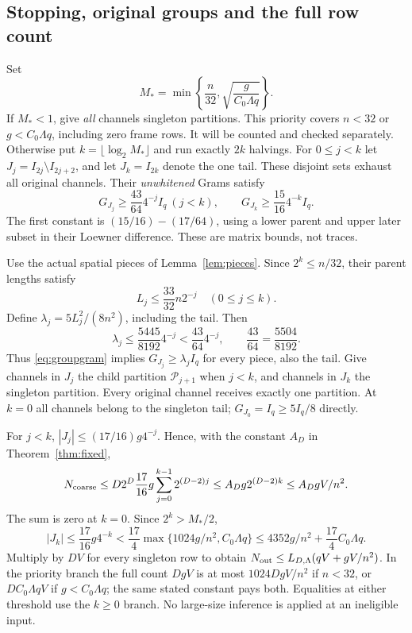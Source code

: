 \subsection{Stopping, original groups and the full row count}
Set
\begin{equation}\label{eq:stop}
 M_* =\min\left\{\frac n{32},\sqrt{\frac g{C_0\Lambda q}}\right\}.
\end{equation}
If $M_*<1$, give \emph{all} channels singleton partitions. This priority
covers $n<32$ or $g<C_0\Lambda q$, including zero frame rows. It will be
counted and checked separately. Otherwise put $k=\lfloor\log_2M_*\rfloor$
and run exactly $2k$ halvings. For $0\leq j<k$ let
$J_j=I_{2j}\setminus I_{2j+2}$, and let $J_k=I_{2k}$ denote the one tail.
These disjoint sets exhaust all original channels. Their \emph{unwhitened}
Grams satisfy
\begin{equation}\label{eq:groupgram}
 G_{J_j}\geq\frac{43}{64}4^{-j}I_q\ (j<k),\qquad
 G_{J_k}\geq\frac{15}{16}4^{-k}I_q.
\end{equation}
The first constant is $(15/16)-(17/64)$, using a lower parent and upper
later subset in their Loewner difference. These are matrix bounds, not traces.

Use the actual spatial pieces of Lemma~\ref{lem:pieces}. Since
$2^k\leq n/32$, their parent lengths satisfy
\[
 L_j\leq\frac{33}{32}n2^{-j}\quad(0\leq j\leq k).
\]
Define $\lambda_j=5L_j^2/(8n^2)$, including the tail. Then
\begin{equation}\label{eq:lambda}
 \lambda_j\leq\frac{5445}{8192}4^{-j}
       <\frac{43}{64}4^{-j},
 \qquad \frac{43}{64}=\frac{5504}{8192}.
\end{equation}
Thus \eqref{eq:groupgram} implies $G_{J_j}\geq\lambda_jI_q$ for every
piece, also the tail. Give channels in $J_j$ the child partition
$\mathcal P_{j+1}$ when $j<k$, and channels in $J_k$ the singleton partition.
Every original channel receives exactly one partition. At $k=0$ all channels
belong to the singleton tail; $G_{J_0}=I_q\geq5I_q/8$ directly.

For $j<k$, $|J_j|\leq(17/16)g4^{-j}$. Hence, with the constant $A_D$ in
Theorem~\ref{thm:fixed},
\[
 N_{\rm coarse}\leq D2^D\frac{17}{16}g
              \sum_{j=0}^{k-1}2^{(D-2)j}
 \leq A_Dg2^{(D-2)k}\leq A_DgV/n^2.
\]
The sum is zero at $k=0$. Since $2^k>M_*/2$,
\[
 |J_k|\leq\frac{17}{16}g4^{-k}
 <\frac{17}{4}\max\{1024g/n^2,C_0\Lambda q\}
 \leq4352g/n^2+\frac{17}{4}C_0\Lambda q.
\]
Multiply by $DV$ for every singleton row to obtain
$N_{\rm out}\leq L_{D,\Lambda}(qV+gV/n^2)$.
In the priority branch the full count $DgV$ is at most
$1024DgV/n^2$ if $n<32$, or $DC_0\Lambda qV$ if $g<C_0\Lambda q$;
the same stated constant pays both. Equalities at either threshold use the
$k\geq0$ branch. No large-size inference is applied at an ineligible input.

